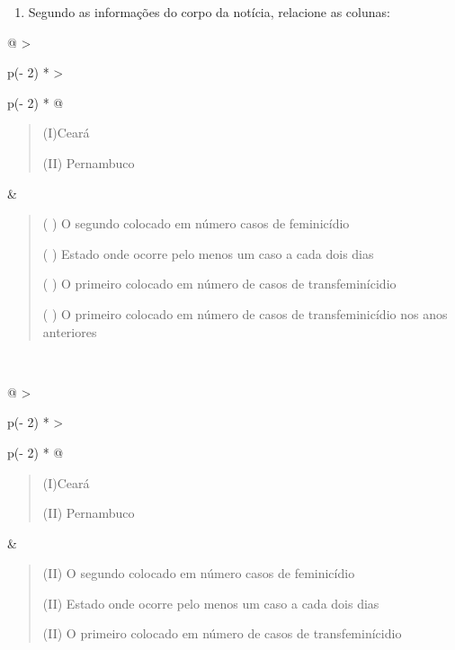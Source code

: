 {\begin{enumerate}
\def\labelenumi{\arabic{enumi}.}
\tightlist
\item
  Segundo as informações do corpo da notícia, relacione as colunas:
\end{enumerate}

\begin{longtable}[]{@{}
  >{\raggedright\arraybackslash}p{(\columnwidth - 2\tabcolsep) * }
  >{\raggedright\arraybackslash}p{(\columnwidth - 2\tabcolsep) * }@{}}
\toprule
\endhead
\begin{minipage}[t]{\linewidth}\raggedright
\begin{quote}
(I)Ceará

(II) Pernambuco
\end{quote}
\end{minipage} & \begin{minipage}[t]{\linewidth}\raggedright
\begin{quote}
( ) O segundo colocado em número casos de feminicídio

( ) Estado onde ocorre pelo menos um caso a cada dois dias

( ) O primeiro colocado em número de casos de transfeminícidio

( ) O primeiro colocado em número de casos de transfeminicídio nos anos
anteriores
\end{quote}
\end{minipage} \\
\bottomrule
\end{longtable}

\begin{longtable}[]{@{}
  >{\raggedright\arraybackslash}p{(\columnwidth - 2\tabcolsep) * }
  >{\raggedright\arraybackslash}p{(\columnwidth - 2\tabcolsep) * }@{}}
\toprule
\endhead
\begin{minipage}[t]{\linewidth}\raggedright
\begin{quote}
(I)Ceará

(II) Pernambuco
\end{quote}
\end{minipage} & \begin{minipage}[t]{\linewidth}\raggedright
\begin{quote}
(II) O segundo colocado em número casos de feminicídio

(II) Estado onde ocorre pelo menos um caso a cada dois dias

(II) O primeiro colocado em número de casos de transfeminícidio


\end{quote}
\end{minipage}
\end{longtable}}
